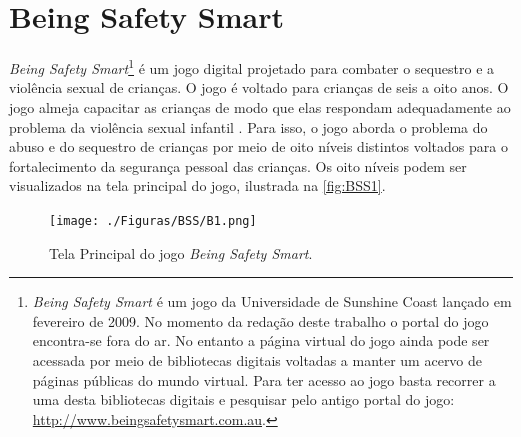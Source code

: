 
\section{Being Safety Smart}\label{sssec:Being}


\textit{Being Safety Smart}\footnote{\textit{Being Safety Smart} é um jogo  da Universidade de Sunshine Coast lançado em fevereiro de 2009. No momento da redação deste trabalho o portal do jogo encontra-se fora do ar. No entanto a página virtual do jogo ainda pode ser acessada por meio de bibliotecas digitais voltadas a manter um acervo de páginas públicas do mundo virtual. Para ter acesso ao jogo basta recorrer a uma desta bibliotecas digitais e pesquisar pelo antigo portal do jogo: \url{http://www.beingsafetysmart.com.au}.} é um jogo digital projetado para combater o sequestro e a violência sexual de crianças. O jogo é voltado para crianças de seis a oito anos. O jogo almeja capacitar as crianças de modo que elas respondam adequadamente ao problema da violência sexual infantil \cite{jones2008online}. Para isso, o jogo aborda  o problema do abuso e do sequestro de crianças por meio de oito níveis distintos voltados para o fortalecimento da segurança pessoal das crianças. Os oito níveis podem ser visualizados na tela principal do jogo, ilustrada na \autoref{fig:BSS1}. 


\begin{figure}[htb]
	\caption{\label{fig:BSS1}Tela Principal do jogo \textit{Being Safety Smart}.}
  \begin{center}\vspace{-0.3cm}
    \texttt{[image: ./Figuras/BSS/B1.png]}
	\end{center}\vspace{-0.5cm}

\end{figure}

